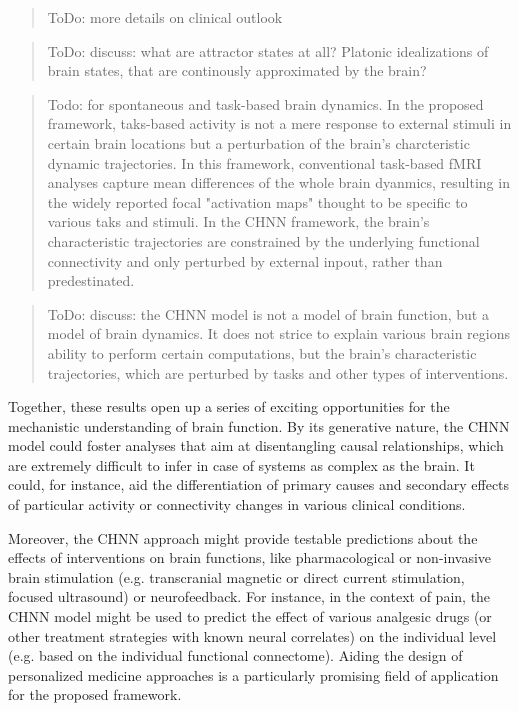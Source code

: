 \documentclass{article}
\begin{document}
\begin{quote}
ToDo: more details on clinical outlook
\end{quote}

\begin{quote}
ToDo: discuss: what are attractor states at all? Platonic idealizations of brain states, that are continously approximated by the brain?
\end{quote}

\begin{quote}
Todo: for spontaneous and task-based brain dynamics. In the proposed framework, taks-based activity is not a mere response to external stimuli in certain brain locations but a perturbation of the brain's charcteristic dynamic trajectories. In this framework, conventional task-based fMRI analyses capture mean differences of the whole brain dyanmics, resulting in the widely reported focal "activation maps" thought to be specific to various taks and stimuli. In the CHNN framework, the brain's characteristic trajectories are constrained by the underlying functional connectivity and only perturbed by external inpout, rather than predestinated.
\end{quote}

\begin{quote}
ToDo: discuss: the CHNN model is not a model of brain function, but a model of brain dynamics. It does not strice to explain various brain regions ability to perform certain computations, but the brain's characteristic trajectories, which are perturbed by tasks and other types of interventions.
\end{quote}

Together, these results open up a series of exciting opportunities for the mechanistic understanding of brain function.
By its generative nature, the CHNN model could foster analyses that aim at disentangling causal relationships, which are
extremely difficult to infer in case of systems as complex as the brain. It could, for instance, aid the differentiation
of primary causes and secondary effects of particular activity or connectivity changes in various clinical conditions.

Moreover, the CHNN approach might provide testable predictions about the effects of interventions on brain functions,
like pharmacological or non-invasive brain stimulation (e.g. transcranial magnetic or direct current stimulation,
focused ultrasound) or neurofeedback.
For instance, in the context of pain, the CHNN model might be used to predict the effect of various analgesic drugs (or
other treatment strategies with known neural correlates) on the individual level (e.g. based on the individual
functional connectome). Aiding the design of personalized medicine approaches is a particularly promising field of
application for the proposed framework.
\end{document}
